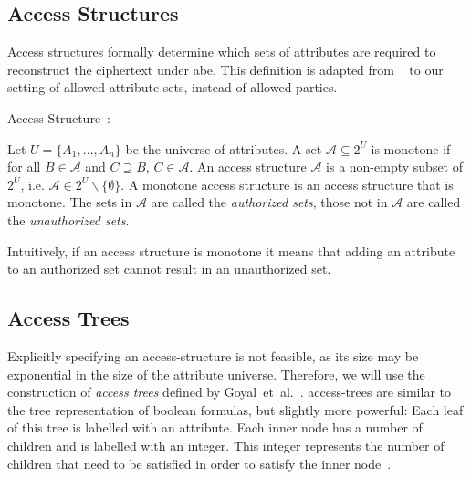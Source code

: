 
\subsection{Access Structures}\label{sec:access-structures}
Access structures formally determine which sets of attributes are required to reconstruct the ciphertext under \acrshort{abe}.
This definition is adapted from \citeauthor{beimel_secure_1996}~\cite{beimel_secure_1996} to our setting of allowed attribute sets, instead of allowed parties.
\begin{definition}Access Structure~\cite{beimel_secure_1996}:

    Let $U = \{A_1, \dots, A_n\}$ be the universe of attributes.
    A set $\mathcal{A} \subseteq 2^{U}$ is monotone if for all $B \in \mathcal{A}$ and $C \supseteq B$,  $C \in \mathcal{A}$.
    An access structure $\mathcal{A}$ is a non-empty subset of $2^U$, i.e. $\mathcal{A} \in 2^U \backslash \{\emptyset\}$.
    A monotone access structure is an access structure that is monotone.
    The sets in $\mathcal{A}$ are called the \emph{authorized sets}, those not in $\mathcal{A}$ are called the \emph{unauthorized sets}.
\end{definition}

Intuitively, if an access structure is monotone it means that adding an attribute to an authorized set cannot result in an unauthorized set. 

\subsection{Access Trees}\label{sec:access-trees}



Explicitly specifying an \gls{access-structure} is not feasible, as its size may be exponential in the size of the attribute universe.
Therefore, we will use the construction of \emph{access trees} defined by Goyal~et~al.~\cite{goyal_attribute-based_2006}.
\Glspl{access-tree} are similar to the tree representation of boolean formulas, but slightly more powerful:
Each leaf of this tree is labelled with an attribute.
Each inner node has a number of children and is labelled with an integer. 
This integer represents the number of children that need to be satisfied in order to satisfy the inner node~\cite{goyal_attribute-based_2006}.

